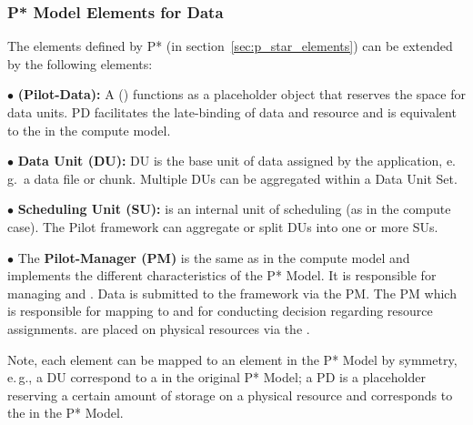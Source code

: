 \documentclass{sig-alternate}
\begin{document}

\subsubsection*{P* Model Elements for Data}


The elements defined by P* (in section~\ref{sec:p_star_elements}) can
be extended by the following elements:


\noindent$\bullet$
  \textbf{\pilot (Pilot-Data):} A \pilotdata (\pd) functions as a 
	placeholder object that reserves the space
	for data units. PD facilitates the late-binding of data and resource and is
	equivalent to the \pilot in the compute model.

\noindent$\bullet$
  \textbf{Data Unit (DU):} DU is the base unit of data assigned by
  the application,  e.\,g.\ a data file or chunk. Multiple DUs can be aggregated 
   within a Data Unit Set.


\noindent$\bullet$
  \textbf{Scheduling Unit (SU):} is an internal unit of scheduling (as in 
  the compute case). The Pilot framework can aggregate or split DUs into one 
  or more SUs.

\noindent$\bullet$ 
  The \textbf{Pilot-Manager (PM)} is the same as in the compute model and
  implements the different characteristics of the P* Model. It is responsible for
  managing \dus and \sus. Data is submitted to the framework via the PM. The PM
  which is responsible for mapping \dus to \sus and for conducting decision 
  regarding resource assignments. \sus are placed on physical resources via the \pilot.

Note, each element can be mapped to an element in the P* Model by
symmetry, e.\,g., a DU correspond to a \cu  in the original P* Model; 
a PD is a placeholder reserving a certain amount of storage on a physical 
resource and corresponds to the \pilot in the P* Model.
\end{document}
